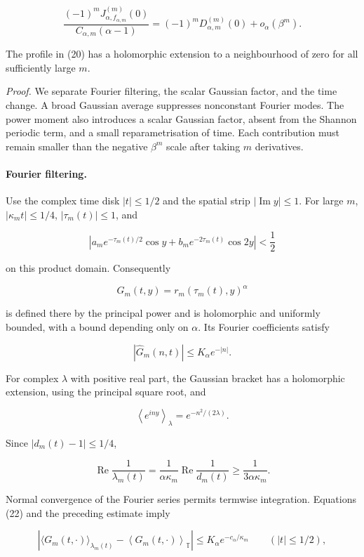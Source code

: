\documentclass[
  11pt,
]{article}
\begin{document}
\[
\tag{21}
 \frac{(-1)^mJ_{\alpha,f_{\alpha,m}}^{(m)}(0)}
 {C_{\alpha,m}(\alpha-1)}
 =(-1)^mD_{\alpha,m}^{(m)}(0)+o_\alpha(\beta^m).
\]

The profile in (20) has a holomorphic extension to a neighbourhood of
zero for all sufficiently large \(m\).

\emph{Proof.} We separate Fourier filtering, the scalar Gaussian factor,
and the time change. A broad Gaussian average suppresses nonconstant
Fourier modes. The power moment also introduces a scalar Gaussian
factor, absent from the Shannon periodic term, and a small
reparametrisation of time. Each contribution must remain smaller than
the negative \(\beta^m\) scale after taking \(m\) derivatives.

\paragraph{Fourier filtering.}\label{fourier-filtering.}

Use the complex time disk \(|t|\leq1/2\) and the spatial strip
\(|\operatorname{Im}y|\leq1\). For large \(m\), \(|\kappa_mt|\leq1/4\),
\(|\tau_m(t)|\leq1\), and

\[
\left|a_me^{-\tau_m(t)/2}\cos y+
       b_me^{-2\tau_m(t)}\cos2y\right|<\frac12
\]

on this product domain. Consequently

\[
G_m(t,y)=r_m(\tau_m(t),y)^\alpha
\]

is defined there by the principal power and is holomorphic and uniformly
bounded, with a bound depending only on \(\alpha\). Its Fourier
coefficients satisfy

\[
\tag{22}
 |\widehat G_m(n,t)|\leq K_\alpha e^{-|n|}.
\]

For complex \(\lambda\) with positive real part, the Gaussian bracket
has a holomorphic extension, using the principal square root, and

\[
\left\langle e^{iny}\right\rangle_\lambda=e^{-n^2/(2\lambda)}.
\]

Since \(|d_m(t)-1|\leq1/4\),

\[
\operatorname{Re}\frac1{\lambda_m(t)}
 =\frac1{\alpha\kappa_m}\operatorname{Re}\frac1{d_m(t)}
 \geq\frac1{3\alpha\kappa_m}.
\]

Normal convergence of the Fourier series permits termwise integration.
Equations (22) and the preceding estimate imply

\[
\tag{23}
 \left|
 \langle G_m(t,\cdot)\rangle_{\lambda_m(t)}
       -\left\langle G_m(t,\cdot)\right\rangle_{\mathbb T}\right|
 \leq K_\alpha e^{-c_\alpha/\kappa_m}
 \qquad(|t|\leq1/2),
\]
\end{document}
